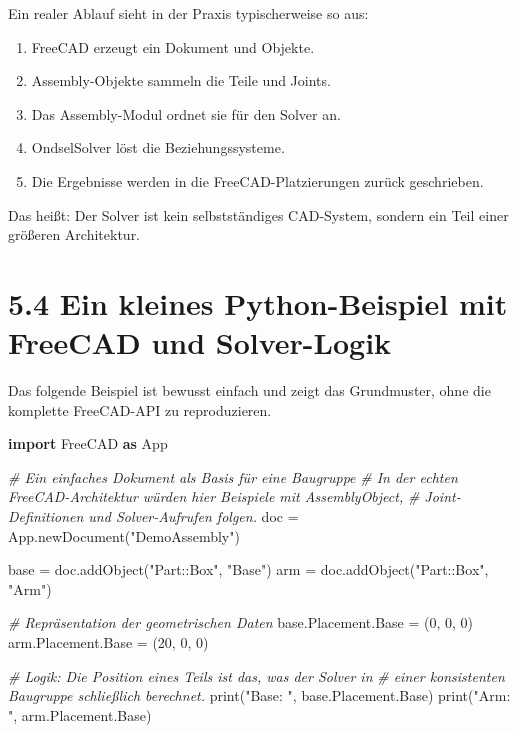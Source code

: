 \documentclass[
  12pt
]{book}
\newenvironment{Shaded}{}{}
\newcommand{\BuiltInTok}[1]{\textcolor[rgb]{0.00,0.50,0.00}{#1}}
\newcommand{\CommentTok}[1]{\textcolor[rgb]{0.38,0.63,0.69}{\textit{#1}}}
\newcommand{\DecValTok}[1]{\textcolor[rgb]{0.25,0.63,0.44}{#1}}
\newcommand{\ImportTok}[1]{\textcolor[rgb]{0.00,0.50,0.00}{\textbf{#1}}}
\newcommand{\NormalTok}[1]{#1}
\newcommand{\OperatorTok}[1]{\textcolor[rgb]{0.40,0.40,0.40}{#1}}
\newcommand{\StringTok}[1]{\textcolor[rgb]{0.25,0.44,0.63}{#1}}
\providecommand{\tightlist}{%
  \setlength{\itemsep}{0pt}\setlength{\parskip}{0pt}}
\begin{document}
Ein realer Ablauf sieht in der Praxis typischerweise so aus:

\begin{enumerate}
\def\labelenumi{\arabic{enumi}.}
\tightlist
\item
  FreeCAD erzeugt ein Dokument und Objekte.
\item
  Assembly-Objekte sammeln die Teile und Joints.
\item
  Das Assembly-Modul ordnet sie für den Solver an.
\item
  OndselSolver löst die Beziehungssysteme.
\item
  Die Ergebnisse werden in die FreeCAD-Platzierungen zurück geschrieben.
\end{enumerate}

Das heißt: Der Solver ist kein selbstständiges CAD-System, sondern ein
Teil einer größeren Architektur.

\hypertarget{ein-kleines-python-beispiel-mit-freecad-und-solver-logik}{%
\section{\texorpdfstring{{5.4} Ein kleines Python-Beispiel mit FreeCAD
und
Solver-Logik}{5.4 Ein kleines Python-Beispiel mit FreeCAD und Solver-Logik}}\label{ein-kleines-python-beispiel-mit-freecad-und-solver-logik}}

Das folgende Beispiel ist bewusst einfach und zeigt das Grundmuster,
ohne die komplette FreeCAD-API zu reproduzieren.

\begin{Shaded}
\begin{Highlighting}[]
\ImportTok{import}\NormalTok{ FreeCAD }\ImportTok{as}\NormalTok{ App}

\CommentTok{\# Ein einfaches Dokument als Basis für eine Baugruppe}
\CommentTok{\# In der echten FreeCAD{-}Architektur würden hier Beispiele mit AssemblyObject,}
\CommentTok{\# Joint{-}Definitionen und Solver{-}Aufrufen folgen.}
\NormalTok{doc }\OperatorTok{=}\NormalTok{ App.newDocument(}\StringTok{"DemoAssembly"}\NormalTok{)}

\NormalTok{base }\OperatorTok{=}\NormalTok{ doc.addObject(}\StringTok{"Part::Box"}\NormalTok{, }\StringTok{"Base"}\NormalTok{)}
\NormalTok{arm }\OperatorTok{=}\NormalTok{ doc.addObject(}\StringTok{"Part::Box"}\NormalTok{, }\StringTok{"Arm"}\NormalTok{)}

\CommentTok{\# Repräsentation der geometrischen Daten}
\NormalTok{base.Placement.Base }\OperatorTok{=}\NormalTok{ (}\DecValTok{0}\NormalTok{, }\DecValTok{0}\NormalTok{, }\DecValTok{0}\NormalTok{)}
\NormalTok{arm.Placement.Base }\OperatorTok{=}\NormalTok{ (}\DecValTok{20}\NormalTok{, }\DecValTok{0}\NormalTok{, }\DecValTok{0}\NormalTok{)}

\CommentTok{\# Logik: Die Position eines Teils ist das, was der Solver in}
\CommentTok{\# einer konsistenten Baugruppe schließlich berechnet.}
\BuiltInTok{print}\NormalTok{(}\StringTok{"Base: "}\NormalTok{, base.Placement.Base)}
\BuiltInTok{print}\NormalTok{(}\StringTok{"Arm: "}\NormalTok{, arm.Placement.Base)}
\end{Highlighting}
\end{Shaded}
\end{document}
